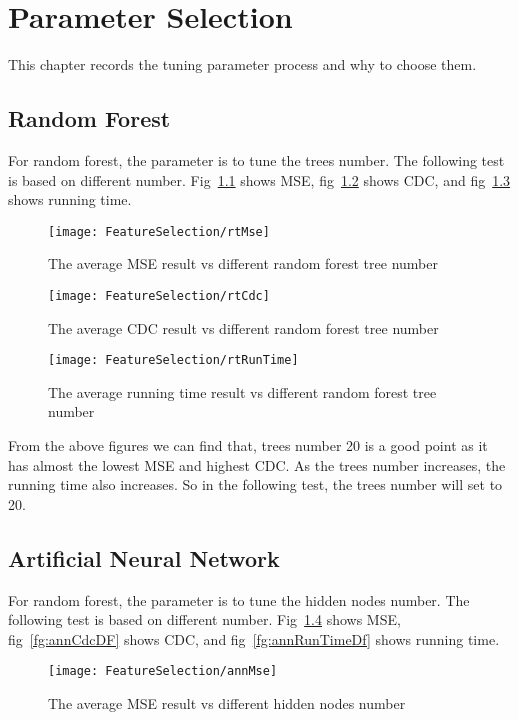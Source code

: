 \chapter{Parameter Selection}
\label{ch:parameterSelection}

This chapter records the tuning parameter process and why to choose them.

\section{Random Forest}
For random forest, the parameter is to tune the trees number. The following test is based on different number. Fig~\ref{fg:rtMseDF} shows MSE, fig~\ref{fg:rtCdcDF} shows CDC, and fig~\ref{fg:rtRunTimeDF} shows running time.

\begin{figure}[h]
	\centering
	\texttt{[image: FeatureSelection/rtMse]}
	\caption{The average MSE result vs different random forest tree number}
	\label{fg:rtMseDF}
\end{figure}

\begin{figure}[h]
	\centering
	\texttt{[image: FeatureSelection/rtCdc]}
	\caption{The average CDC result vs different random forest tree number}
	\label{fg:rtCdcDF}
\end{figure}

\begin{figure}[h]
\centering
\texttt{[image: FeatureSelection/rtRunTime]}
\caption{The average running time result vs different random forest tree number}
\label{fg:rtRunTimeDF}
\end{figure}

From the above figures we can find that, trees number 20 is a good point as it has almost the lowest MSE and highest CDC. As the trees number increases, the running time also increases. So in the following test, the trees number will set to 20.

\section{Artificial Neural Network}
For random forest, the parameter is to tune the hidden nodes number. The following test is based on different number. Fig~\ref{fg:annMseDF} shows MSE, fig~\ref{fg:annCdcDF} shows CDC, and fig~\ref{fg:annRunTimeDf} shows running time.

\begin{figure}[h]
	\centering
	\texttt{[image: FeatureSelection/annMse]}
	\caption{The average MSE result vs different hidden nodes number}
	\label{fg:annMseDF}
\end{figure}

